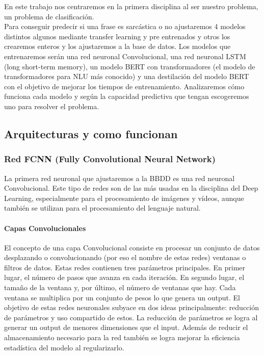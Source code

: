 \documentclass[10pt,riqno,a4paper,twoside]{article}\usepackage[]{graphicx}\usepackage[]{color}
\begin{document}
En este trabajo nos centraremos en la primera disciplina al ser nuestro problema, un problema de clasificación. \\

Para conseguir predecir si una frase es sarc\'{a}stica o no ajustaremos 4 modelos distintos algunos mediante transfer learning y pre entrenados y otros los crearemos enteros y los ajustaremos a la base de datos. Los modelos que entrenaremos ser\'{a}n una red neuronal Convolucional, una red neuronal LSTM (long short-term memory), un modelo BERT con transformadores (el modelo de transformadores para NLU m\'{a}s conocido) y una destilaci\'{o}n del modelo BERT con el objetivo de mejorar los tiempos de entrenamiento. Analizaremos cómo funciona cada modelo y seg\'{u}n la capacidad predictiva que tengan escogeremos uno para resolver el problema. 

\subsection{Arquitecturas y como funcionan}

\subsubsection{Red FCNN (Fully Convolutional Neural Network)}

La primera red neuronal que ajustaremos a la BBDD es una red neuronal Convolucional. Este tipo de redes son de las más usadas en la disciplina del Deep Learning, especialmente para el procesamiento de imágenes y vídeos, aunque también se utilizan para el procesamiento del lenguaje natural.

\paragraph{Capas Convolucionales}

El concepto de una capa Convolucional consiste en procesar un conjunto de datos desplazando o convolucionando (por eso el nombre de estas redes) ventanas o filtros de datos. Estas redes contienen tres parámetros principales. En primer lugar, el número de pasos que avanza en cada iteración. En segundo lugar, el tamaño de la ventana y, por último, el número de ventanas que hay. Cada ventana se multiplica por un conjunto de pesos lo que genera un output. El objetivo de estas redes neuronales subyace en dos ideas principalmente: reducción de parámetros y uso compartido de estos. La reducción de parámetros se logra al generar un output de menores dimensiones que el input. Además de reducir el almacenamiento necesario para la red también se logra mejorar la eficiencia estadística del modelo al regularizarlo. \\
\end{document}
